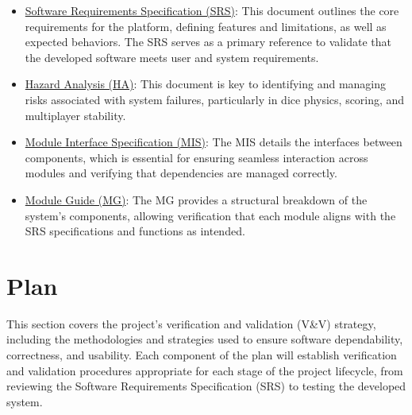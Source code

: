 \documentclass[12pt, titlepage]{article}
\begin{document}
\begin{itemize}
	\item \href{https://github.com/John-Popovici/duel-of-the-eights/blob/main/docs/SRS/SRS.pdf}{Software Requirements Specification (SRS)}: This document outlines the core requirements for the platform, defining features and limitations, as well as expected behaviors. The SRS serves as a primary reference to validate that the developed software meets user and system requirements.
	\item \href{https://github.com/John-Popovici/duel-of-the-eights/blob/main/docs/HazardAnalysis/HazardAnalysis.pdf}{Hazard Analysis (HA)}: This document is key to identifying and managing risks associated with system failures, particularly in dice physics, scoring, and multiplayer stability.
	\item \href{https://github.com/John-Popovici/duel-of-the-eights/blob/main/docs/Design/SoftDetailedDes/MIS.pdf}{Module Interface Specification (MIS)}: The MIS details the interfaces between components, which is essential for ensuring seamless interaction across modules and verifying that dependencies are managed correctly.
	\item \href{https://github.com/John-Popovici/duel-of-the-eights/blob/main/docs/Design/SoftArchitecture/MG.pdf}{Module Guide (MG)}: The MG provides a structural breakdown of the system's components, allowing verification that each module aligns with the SRS specifications and functions as intended.
\end{itemize}


\section{Plan}


\noindent This section covers the project's verification and validation (V\&V) strategy, including the methodologies and strategies used to ensure software dependability, correctness, and usability. Each component of the plan will establish verification and validation procedures appropriate for each stage of the project lifecycle, from reviewing the Software Requirements Specification (SRS) to testing the developed system.
\end{document}
